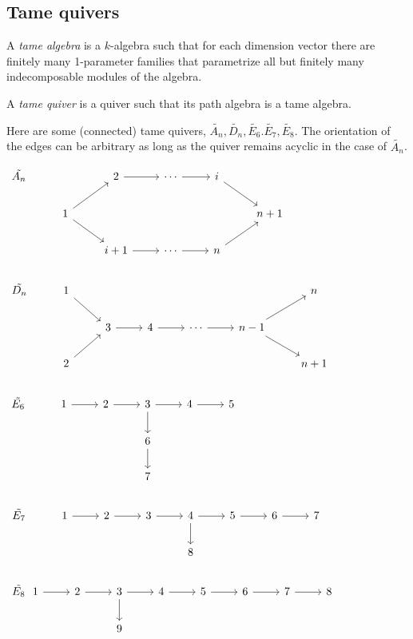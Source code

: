 \subsection{Tame quivers}
\begin{definition}
A \textit{tame algebra} is a $k$-algebra such that for each dimension vector there are finitely many 1-parameter families that parametrize all but finitely many indecomposable modules of the algebra.\\
\end{definition}
\begin{definition}
A \textit{tame quiver} is a quiver such that its path algebra is a tame algebra.\\
\end{definition}
\begin{example}
Here are some (connected) tame quivers, $\tilde{A_n}, \tilde{D_n}, \tilde{E_6}. \tilde{E_7}, \tilde{E_8}$. The orientation of the edges can be arbitrary as long as the quiver remains acyclic in the case of $\tilde{A_n}$.
\end{example}
$\begin{tikzcd}
\tilde{A_n} &    		&2\arrow[r]  &\cdots\arrow[r]    &i\arrow[rd]	 &\\
&1\arrow[rd]\arrow[ru]& 		  &  				&   		&n+1\\
&     				&i+1\arrow[r]&\cdots\arrow[r] 	&n\arrow[ru]& \\
\end{tikzcd}$\\
$\begin{tikzcd}
\tilde{D_n} &1\arrow[rd] &  		& 		     &		         		&					&n	\\
&		&3\arrow[r]&  4\arrow[r] & \cdots\arrow[r]           &n-1\arrow[rd]\arrow[ru] 	&\\
&2\arrow[ru]&		&   		    & 					& 					&n+1\\
\end{tikzcd}$\\
$\begin{tikzcd}
\tilde{E_6}& 1\arrow[r] & 2\arrow[r] & 3\arrow[r]\arrow[d] & 4\arrow[r] & 5\\
&		&		&  6\arrow[d] & 			& \\
&		&		&  7 & 			& \\
\end{tikzcd}$\\
$\begin{tikzcd}
\tilde{E_7}& 1\arrow[r] & 2\arrow[r] & 3\arrow[r]& 4\arrow[r]\arrow[d]  & 5\arrow[r] & 6\arrow[r] & 7\\
&		&		   &  		     & 	8		      & 		& 		&\\
\end{tikzcd}$\\
$\begin{tikzcd}
\tilde{E_8}\,\,\,\, 1\arrow[r] & 2\arrow[r] & 3\arrow[r]\arrow[d] & 4\arrow[r] & 5\arrow[r] & 6\arrow[r] & 7\arrow[r] & 8\\
	&		&  			9& 			& & & &\\
\end{tikzcd}$
